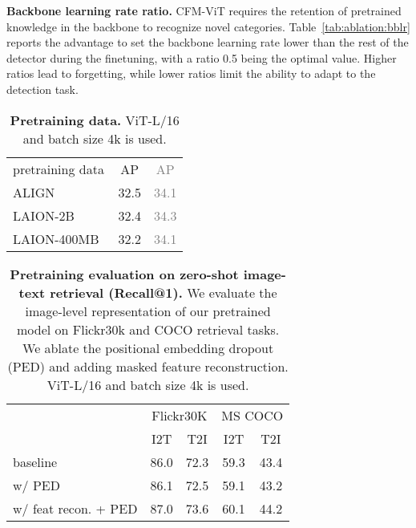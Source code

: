 \documentclass[10pt,twocolumn,letterpaper]{article}
\newcommand{\gray}[1]{\textcolor{gray}{{#1}}}
\newcommand{\white}[1]{\color[HTML]{FFFFFF}{{#1}}}
\newcommand{\tabref}[1]{Table~\ref{#1}}
\renewcommand{\paragraph}[1]{\vspace{1mm}\noindent\textbf{#1}}
\newcommand{\tablestyle}[2]{\setlength{\tabcolsep}{#1}\renewcommand{\arraystretch}{#2}\centering\footnotesize}
\newcommand{\ours}{CFM-ViT\xspace}
\begin{document}
\paragraph{Backbone learning rate ratio.}\quad
\ours requires the retention of pretrained knowledge in the backbone to recognize novel categories. \tabref{tab:ablation:bblr} reports the advantage to set the backbone learning rate lower than the rest of the detector during the finetuning, with a ratio 0.5 being the optimal value. Higher ratios lead to forgetting, while lower ratios limit the ability to adapt to the detection task.

\begin{table}[t]
\centering
\tablestyle{10.0pt}{1.1}\begin{tabular}{lcc}
{pretraining data}  & AP  &   \gray{AP} \\
\shline
ALIGN~\cite{align}   & 32.5    & \gray{34.1}  \\
LAION-2B~\cite{schuhmann2021laion}     & 32.4    & \gray{34.3} \\
LAION-400MB~\cite{schuhmann2021laion}  & 32.2   & \gray{34.1} \\
\end{tabular}
\vspace{-1mm}
\caption{\textbf{Pretraining data.} ViT-L/16 and batch size 4k is used.}
\label{tab:pretraining_data}
\vspace{-2mm}
\end{table}

\begin{table}[t]
\centering
\tablestyle{7pt}{1.1}\begin{tabular}{lcccc}
 &
\multicolumn{2}{c}{Flickr30K {\white{-}}} & \multicolumn{2}{c}{{\white{-}} MS COCO}\\
 & I2T & T2I {\white{-}} & {\white{-}} I2T & T2I \\
\shline
baseline        & 86.0 & 72.3 {\white{-}}&{\white{-}} 59.3 & 43.4 \\
w/ PED         & 86.1 & 72.5 {\white{-}}&{\white{-}} 59.1 & 43.2  \\
w/ feat recon. + PED & 87.0 & 73.6 {\white{-}}&{\white{-}} 60.1 & 44.2 \\
\end{tabular}
\caption{\textbf{Pretraining evaluation on zero-shot image-text retrieval (Recall@1).} We evaluate the image-level representation of our pretrained model on Flickr30k and COCO retrieval tasks. We ablate the positional embedding dropout (PED) and adding masked feature reconstruction. ViT-L/16 and batch size 4k is used.}
\label{tab:retrieval}
\vspace{-3mm}
\end{table}
\end{document}
